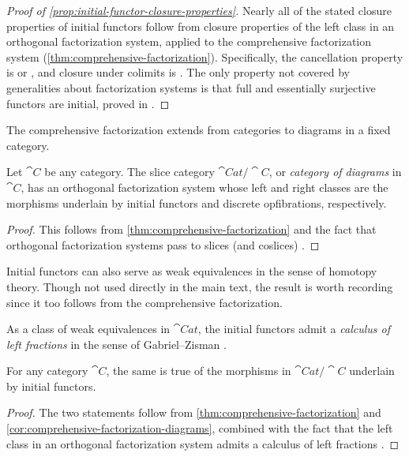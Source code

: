 \documentclass[11pt]{article}
\numberwithin{equation}{section}
\begin{document}
\begin{proof}[Proof of \cref{prop:initial-functor-closure-properties}]
  Nearly all of the stated closure properties of initial functors follow from
  closure properties of the left class in an orthogonal factorization system,
  applied to the comprehensive factorization system
  (\cref{thm:comprehensive-factorization}). Specifically, the cancellation
  property is \cite[\mbox{Proposition 2.2}]{joyal2020} or \cite[\mbox{Lemma
    1.13}]{riehl2008}, and closure under colimits is \cite[\mbox{Theorem
    1.17}]{riehl2008}. The only property not covered by generalities about
  factorization systems is that full and essentially surjective functors are
  initial, proved in \cite[\mbox{Lemma 9.8}]{patterson2023}.
\end{proof}

The comprehensive factorization extends from categories to diagrams in a fixed
category.

\begin{corollary}
  \label{cor:comprehensive-factorization-diagrams}
  Let $\cat{C}$ be any category. The slice category $\cat{Cat}/\cat{C}$, or
  \emph{category of diagrams} in $\cat{C}$, has an orthogonal factorization
  system whose left and right classes are the morphisms underlain by initial
  functors and discrete opfibrations, respectively.
\end{corollary}
\begin{proof}
  This follows from \cref{thm:comprehensive-factorization} and the fact that
  orthogonal factorization systems pass to slices (and coslices)
  \cite[\S{1}]{joyal2020}.
\end{proof}

Initial functors can also serve as weak equivalences in the sense of homotopy
theory. Though not used directly in the main text, the result is worth recording
since it too follows from the comprehensive factorization.

\begin{corollary}
  \label{cor:calculus-of-fractions}
  As a class of weak equivalences in $\cat{Cat}$, the initial functors admit a
  \emph{calculus of left fractions} in the sense of Gabriel--Zisman
  \cite[\S{I.2}]{gabriel1967}.

  For any category $\cat{C}$, the same is true of the morphisms in
  $\cat{Cat}/\cat{C}$ underlain by initial functors.
\end{corollary}
\begin{proof}
  The two statements follow from \cref{thm:comprehensive-factorization} and
  \cref{cor:comprehensive-factorization-diagrams}, combined with the fact that
  the left class in an orthogonal factorization system admits a calculus of
  left fractions \cite[\mbox{Example 2.4}]{kurz2005}.
\end{proof}
\end{document}
